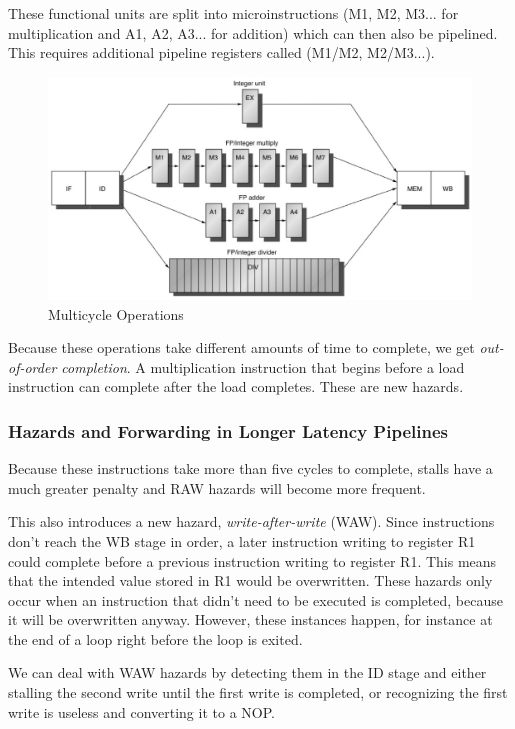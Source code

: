 \documentclass{article}
\begin{document}

These functional units are split into microinstructions (M1, M2, M3... for multiplication and A1, A2, A3... for addition) which can then also be pipelined. This requires additional pipeline registers called (M1/M2, M2/M3...).

\begin{figure}[ht!]
\centering
\includegraphics[width=120mm]{img/PipelinedFU.png}
\caption{Multicycle Operations}
\end{figure}

Because these operations take different amounts of time to complete, we get \textit{out-of-order completion}. A multiplication instruction that begins before a load instruction can complete after the load completes. These are new hazards. 

\subsubsection{Hazards and Forwarding in Longer Latency Pipelines}

Because these instructions take more than five cycles to complete, stalls have a much greater penalty and RAW hazards will become more frequent. 


This also introduces a new hazard, \textit{write-after-write} (WAW). Since instructions don't reach the WB stage in order, a later instruction writing to register R1 could complete before a previous instruction writing to register R1. This means that the intended value stored in R1 would be overwritten. These hazards only occur when an instruction that didn't need to be executed is completed, because it will be overwritten anyway. However, these instances happen, for instance at the end of a loop right before the loop is exited. 

We can deal with WAW hazards by detecting them in the ID stage and either stalling the second write until the first write is completed, or recognizing the first write is useless and converting it to a NOP. 
\end{document}
